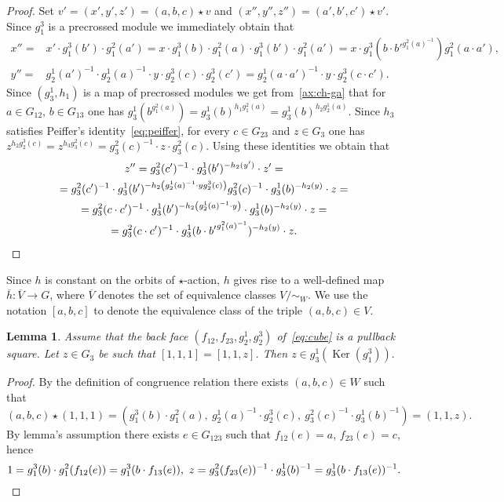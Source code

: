 \documentclass[oneside, 10pt]{amsart}
\DeclareMathOperator{\Ker}{Ker}
\numberwithin{equation}{section}
\numberwithin{thm}{section}
\newtheorem{lemma}[thm]{Lemma}
\numberwithin{lemma}{section}
\theoremstyle{definition}
\theoremstyle{remark}
\begin{document}
\begin{proof}
Set $v'=(x', y', z') = (a, b, c) \star v$ and $(x'', y'', z'') = (a', b', c') \star v'$.
Since $g_1^3$ is a precrossed module we immediately obtain that
\begin{align*}
x'' =& x' \cdot g_1^3(b') \cdot g_1^2(a') = x \cdot g_1^3(b) \cdot g_1^2(a) \cdot g_1^3(b') \cdot g_1^2(a') = x \cdot g_1^3(b \cdot b'^{g_1^2(a)^{-1}}) g_1^2(a \cdot a'),\\
y'' =& g_2^1(a')^{-1} \cdot g_2^1(a)^{-1} \cdot y \cdot g_2^3(c) \cdot g_2^3(c') = g_2^1(a\cdot a')^{-1} \cdot y \cdot g_2^{3}(c\cdot c'). \end{align*}
Since $(g_3^1, h_1)$ is a map of precrossed modules we get from~\eqref{ax:ch-ga} that for $a \in G_{12}$, $b \in G_{13}$ one has $g_3^1(b^{g_1^2(a)}) = g_3^1(b)^{h_1 g_1^2(a)} = g_3^1(b)^{h_2g_2^1(a)}$.
Since $h_3$ satisfies Peiffer's identity~\eqref{eq:peiffer}, for every $c \in G_{23}$ and $z \in G_3$ one has $z ^{h_2 g_2^3(c)} = z^{ h_3 g_3^2(c)} = g_3^2(c)^{-1} \cdot z \cdot g_3^2(c)$.
Using these identities we obtain that
\begin{multline*}
z'' = g_3^2(c')^{-1} \cdot g_3^1(b')^{-h_2(y')} \cdot z' = \\
= g_3^2(c')^{-1} \cdot g_3^1(b')^{- h_2 \left( g_2^1(a)^{-1} \cdot y g_2^3(c) \right)} g_3^2(c)^{-1} \cdot g_3^1(b)^{-h_2(y)} \cdot z = \\
= g_3^2(c \cdot c')^{-1} \cdot g_3^1(b')^{- h_2 \left( g_2^1(a)^{-1} \cdot y \right)} \cdot g_3^1(b)^{-h_2(y)} \cdot z = \\
= g_3^2(c \cdot c')^{-1} \cdot g_3^1(b \cdot {b'} ^ {g_1^2(a)^{-1}})^{- h_2 \left( y \right)} \cdot z. \qedhere
\end{multline*}
\end{proof}
Since $h$ is constant on the orbits of $\star$-action, $h$ gives rise to a well-defined map $\overline{h} \colon \overline{V} \to G$,
where $\overline{V}$ denotes the set of equivalence classes $V/\sim_W.$
We use the notation $[a, b, c]$ to denote the equivalence class of the triple $(a, b, c) \in V$.

\begin{lemma}\label{lem:one-one-z} Assume that the back face $(f_{12}, f_{23}, g_2^1, g_2^3)$ of~\eqref{eq:cube} is a pullback square.
Let $z \in G_3$ be such that $[1, 1, 1] = [1, 1, z]$.
Then $z \in g_3^1(\Ker(g_1^3)).$ \end{lemma}
\begin{proof} By the definition of congruence relation there exists $(a, b, c)\in W$ such that
\[ (a, b, c) \star (1, 1, 1) = ( g_1^3(b) \cdot g_1^2(a),\ g_2^1(a)^{-1} \cdot g_2^3(c),\ g_3^2(c)^{-1} \cdot g_3^1(b)^{-1}) = (1,1,z). \]
By lemma's assumption there exists $e \in G_{123}$ such that $f_{12}(e) = a$, $f_{23}(e) = c$, hence
\[ 1 = g_1^3(b) \cdot g_1^2(f_{12}(e)) = g_1^3(b \cdot f_{13}(e)),\ z = g_3^2(f_{23}(e))^{-1} \cdot g_3^1(b)^{-1} = g_3^1(b \cdot f_{13}(e))^{-1}. \qedhere\] \end{proof}
\end{document}
